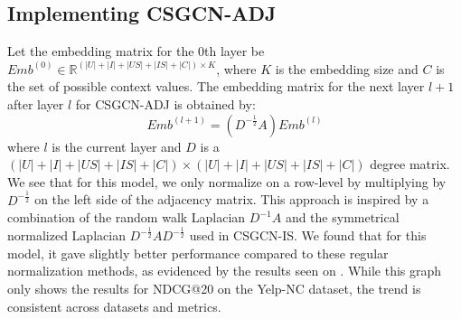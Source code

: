 \subsection{Implementing CSGCN-ADJ}
Let the embedding matrix for the 0th layer be $Emb^{(0)} \in \mathbb{R}^{(|U| + |I| + |US| + |IS| + |C|) \times K}$, where $K$ is the embedding size and $C$ is the set of possible context values.
The embedding matrix for the next layer $l+1$ after layer $l$ for CSGCN-ADJ is obtained by:
\begin{equation}
    Emb^{(l+1)} = (D^{-\frac{1}{2}}A)Emb^{(l)}
\end{equation}
where $l$ is the current layer and $D$ is a $(|U| + |I| + |US| + |IS| + |C|) \times (|U| + |I| + |US| + |IS|+ |C|)$ degree matrix. 
We see that for this model, we only normalize on a row-level by multiplying by $D^{-\frac{1}{2}}$ on the left side of the adjacency matrix.
This approach is inspired by a combination of the random walk Laplacian $D^{-1}A$ and the symmetrical normalized Laplacian $D^{-\frac{1}{2}}AD^{-\frac{1}{2}}$ used in CSGCN-IS.
We found that for this model, it gave slightly better performance compared to these regular normalization methods, as evidenced by the results seen on .
While this graph only shows the results for NDCG@20 on the Yelp-NC dataset, the trend is consistent across datasets and metrics.


